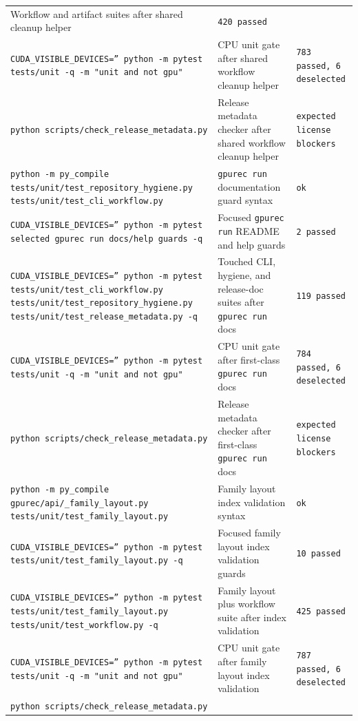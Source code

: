 \documentclass[11pt]{article}
\begin{document}
\begin{center}
\begin{tabular}{lll}
Workflow and artifact suites after shared cleanup helper &
\texttt{420 passed} \\
\texttt{CUDA\_VISIBLE\_DEVICES='' python -m pytest tests/unit -q -m "unit and not gpu"} &
CPU unit gate after shared workflow cleanup helper &
\texttt{783 passed, 6 deselected} \\
\texttt{python scripts/check\_release\_metadata.py} &
Release metadata checker after shared workflow cleanup helper &
\texttt{expected license blockers} \\
\texttt{python -m py\_compile tests/unit/test\_repository\_hygiene.py tests/unit/test\_cli\_workflow.py} &
\texttt{gpurec run} documentation guard syntax &
\texttt{ok} \\
\texttt{CUDA\_VISIBLE\_DEVICES='' python -m pytest selected gpurec run docs/help guards -q} &
Focused \texttt{gpurec run} README and help guards &
\texttt{2 passed} \\
\texttt{CUDA\_VISIBLE\_DEVICES='' python -m pytest tests/unit/test\_cli\_workflow.py tests/unit/test\_repository\_hygiene.py tests/unit/test\_release\_metadata.py -q} &
Touched CLI, hygiene, and release-doc suites after \texttt{gpurec run} docs &
\texttt{119 passed} \\
\texttt{CUDA\_VISIBLE\_DEVICES='' python -m pytest tests/unit -q -m "unit and not gpu"} &
CPU unit gate after first-class \texttt{gpurec run} docs &
\texttt{784 passed, 6 deselected} \\
\texttt{python scripts/check\_release\_metadata.py} &
Release metadata checker after first-class \texttt{gpurec run} docs &
\texttt{expected license blockers} \\
\texttt{python -m py\_compile gpurec/api/\_family\_layout.py tests/unit/test\_family\_layout.py} &
Family layout index validation syntax &
\texttt{ok} \\
\texttt{CUDA\_VISIBLE\_DEVICES='' python -m pytest tests/unit/test\_family\_layout.py -q} &
Focused family layout index validation guards &
\texttt{10 passed} \\
\texttt{CUDA\_VISIBLE\_DEVICES='' python -m pytest tests/unit/test\_family\_layout.py tests/unit/test\_workflow.py -q} &
Family layout plus workflow suite after index validation &
\texttt{425 passed} \\
\texttt{CUDA\_VISIBLE\_DEVICES='' python -m pytest tests/unit -q -m "unit and not gpu"} &
CPU unit gate after family layout index validation &
\texttt{787 passed, 6 deselected} \\
\texttt{python scripts/check\_release\_metadata.py} &

\end{tabular}
\end{center}
\end{document}
